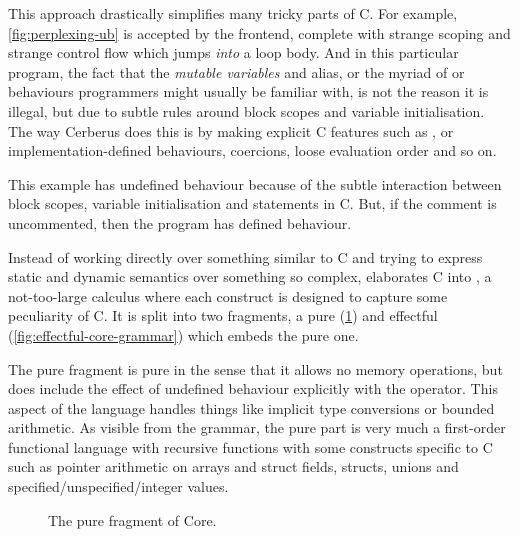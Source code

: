 This approach drastically simplifies many tricky parts of C. For example,
\cref{fig:perplexing-ub} is accepted by the frontend, complete with strange
scoping and strange control flow which jumps \emph{into} a loop body. And in
this particular program, the fact that the \emph{mutable variables} 
and  alias, or the myriad of  or 
behaviours programmers might usually be familiar with, is not the reason it is
illegal, but due to subtle rules around block scopes and variable
initialisation. The way Cerberus does this is by making explicit C features
such as ,  or implementation-defined behaviours,
coercions, loose evaluation order and so on.

\begin{marginfigure}
    \caption{This example has undefined behaviour because of the subtle
        interaction between block scopes, variable initialisation and
         statements in C. But, if the comment is uncommented,
        then the program has defined behaviour.}\label{fig:perplexing-ub}
\end{marginfigure}

Instead of working directly over something similar to C and trying to express
static and dynamic semantics over something so complex, 
elaborates C into , a not-too-large calculus where each construct
is designed to capture some peculiarity of C. It is split into two fragments, a
pure (\cref{fig:pure-core-grammar}) and effectful
(\cref{fig:effectful-core-grammar}) which embeds the pure one.

The pure fragment is pure in the sense that it allows no memory operations, but does
include the effect of undefined behaviour explicitly with the
 operator. This aspect of the language handles %
things like implicit type conversions or bounded arithmetic. As visible from the
grammar, the pure part is very much a first-order functional language with
recursive functions with some constructs specific to C such as pointer
arithmetic on arrays and struct fields, structs, unions and
specified/unspecified/integer values.

\begin{figure}[tp]
    \ContinuedFloat*
    \raggedright%
    \small%
    \begin{minipage}{0.9\textwidth}
    \grammartabularSTY{%
        \cnpureXXcore{}\cnafterlastrule{}
    }
    \end{minipage}
    \begin{minipage}{0.4\textwidth}%
    \begingroup%
    \renewcommand{\cnprodline}[6]{& & $#1$ & $#2$ & $#3$ & $#5$ &}
    \endgroup%
    \end{minipage}
    \caption{The pure fragment of Core.}\label{fig:pure-core-grammar}
\end{figure}

